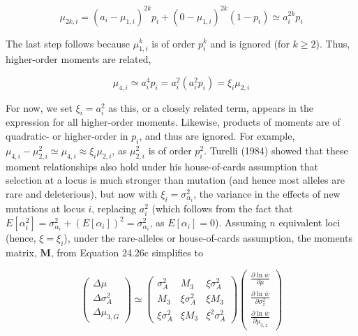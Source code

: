 \documentclass{article}
\begin{document}
\begin{equation}
\mu_{2k,i}=\left(a_{i}-\mu_{1,i}\right)^{2k}p_{i}+\left(0-\mu_{1,i}\right)^{2k}\left(1-p_{i}\right)\simeq a_{i}^{2k}p_{i}
\tag{24.32a}
\label{eq:24_32a}
\end{equation}

The last step follows because  $ \mu_{1,i}^{k} $ is of order  $ p_{i}^{k} $ and is ignored (for  $ k \geq 2 $). Thus, higher-order moments are related,

\begin{equation}
\mu_{4,i}\simeq a_{i}^{4}p_{i}=a_{i}^{2}\left(a_{i}^{2}p_{i}\right)=\xi_{i}\mu_{2,i}
\end{equation}

For now, we set  $ \xi_i = a_i^2 $ as this, or a closely related term, appears in the expression for all higher-order moments. Likewise, products of moments are of quadratic- or higher-order in  $ p_i $, and thus are ignored. For example,  $ \mu_{4,i} - \mu_{2,i}^2 \simeq \mu_{4,i} \approx \xi_i \mu_{2,i} $, as  $ \mu_{2,i}^2 $ is of order  $ p_i^2 $. Turelli (1984) showed that these moment relationships also hold under his house-of-cards assumption that selection at a locus is much stronger than mutation (and hence most alleles are rare and deleterious), but now with  $ \xi_i = \sigma_{\alpha_i}^2 $, the variance in the effects of new mutations at locus  $ i $, replacing  $ a_i^2 $ (which follows from the fact that  $ E[\alpha_i^2] = \sigma_{\alpha_i}^2 + (E[\alpha_i])^2 = \sigma_{\alpha_i}^2 $, as  $ E[\alpha_i] = 0 $). Assuming  $ n $ equivalent loci (hence,  $ \xi = \xi_i $), under the rare-alleles or house-of-cards assumption, the moments matrix,  $ \mathbf{M} $, from Equation 24.26c simplifies to

\begin{equation}
\begin{pmatrix}\Delta\mu\\\Delta\sigma_{A}^{2}\\\Delta\mu_{3,G}\end{pmatrix}\simeq\begin{pmatrix}\sigma_{A}^{2}&M_{3}&\xi\sigma_{A}^{2}\\M_{3}&\xi\sigma_{A}^{2}&\xi M_{3}\\\xi\sigma_{A}^{2}&\xi M_{3}&\xi^{2}\sigma_{A}^{2}\end{pmatrix}\begin{pmatrix}\frac{\partial\ln\overline{w}}{\partial\mu}\\\frac{\partial\ln\overline{w}}{\partial\sigma_{z}^{2}}\\\frac{\partial\ln\overline{w}}{\partial\mu_{3,z}}\end{pmatrix}
\tag{24.32b}
\label{eq:24_32b}
\end{equation}
\end{document}
